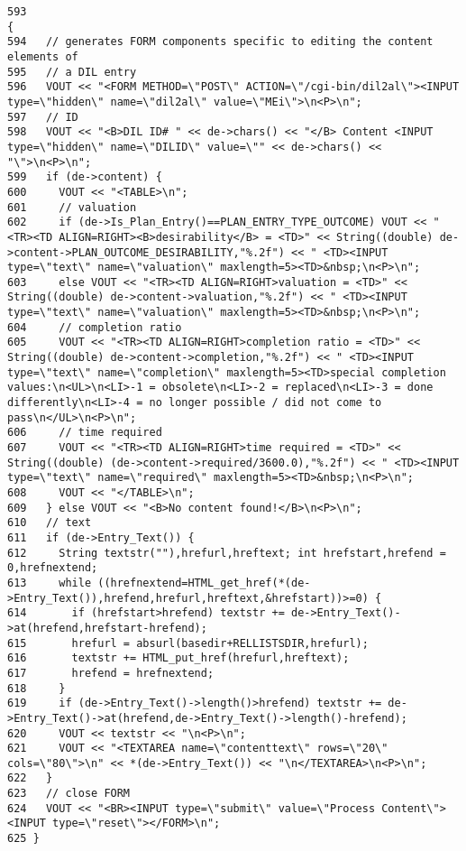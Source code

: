 \footnotesize\begin{verbatim}593                                                                               {
594   // generates FORM components specific to editing the content elements of
595   // a DIL entry
596   VOUT << "<FORM METHOD=\"POST\" ACTION=\"/cgi-bin/dil2al\"><INPUT type=\"hidden\" name=\"dil2al\" value=\"MEi\">\n<P>\n";
597   // ID
598   VOUT << "<B>DIL ID# " << de->chars() << "</B> Content <INPUT type=\"hidden\" name=\"DILID\" value=\"" << de->chars() << "\">\n<P>\n";
599   if (de->content) {
600     VOUT << "<TABLE>\n";
601     // valuation
602     if (de->Is_Plan_Entry()==PLAN_ENTRY_TYPE_OUTCOME) VOUT << "<TR><TD ALIGN=RIGHT><B>desirability</B> = <TD>" << String((double) de->content->PLAN_OUTCOME_DESIRABILITY,"%.2f") << " <TD><INPUT type=\"text\" name=\"valuation\" maxlength=5><TD>&nbsp;\n<P>\n";
603     else VOUT << "<TR><TD ALIGN=RIGHT>valuation = <TD>" << String((double) de->content->valuation,"%.2f") << " <TD><INPUT type=\"text\" name=\"valuation\" maxlength=5><TD>&nbsp;\n<P>\n";
604     // completion ratio
605     VOUT << "<TR><TD ALIGN=RIGHT>completion ratio = <TD>" << String((double) de->content->completion,"%.2f") << " <TD><INPUT type=\"text\" name=\"completion\" maxlength=5><TD>special completion values:\n<UL>\n<LI>-1 = obsolete\n<LI>-2 = replaced\n<LI>-3 = done differently\n<LI>-4 = no longer possible / did not come to pass\n</UL>\n<P>\n";
606     // time required
607     VOUT << "<TR><TD ALIGN=RIGHT>time required = <TD>" << String((double) (de->content->required/3600.0),"%.2f") << " <TD><INPUT type=\"text\" name=\"required\" maxlength=5><TD>&nbsp;\n<P>\n";
608     VOUT << "</TABLE>\n";
609   } else VOUT << "<B>No content found!</B>\n<P>\n";
610   // text
611   if (de->Entry_Text()) {
612     String textstr(""),hrefurl,hreftext; int hrefstart,hrefend = 0,hrefnextend; 
613     while ((hrefnextend=HTML_get_href(*(de->Entry_Text()),hrefend,hrefurl,hreftext,&hrefstart))>=0) {
614       if (hrefstart>hrefend) textstr += de->Entry_Text()->at(hrefend,hrefstart-hrefend);
615       hrefurl = absurl(basedir+RELLISTSDIR,hrefurl);
616       textstr += HTML_put_href(hrefurl,hreftext);
617       hrefend = hrefnextend;
618     }
619     if (de->Entry_Text()->length()>hrefend) textstr += de->Entry_Text()->at(hrefend,de->Entry_Text()->length()-hrefend);
620     VOUT << textstr << "\n<P>\n";
621     VOUT << "<TEXTAREA name=\"contenttext\" rows=\"20\" cols=\"80\">\n" << *(de->Entry_Text()) << "\n</TEXTAREA>\n<P>\n";
622   }
623   // close FORM
624   VOUT << "<BR><INPUT type=\"submit\" value=\"Process Content\"> <INPUT type=\"reset\"></FORM>\n";
625 }
\end{verbatim}\normalsize 
{}
